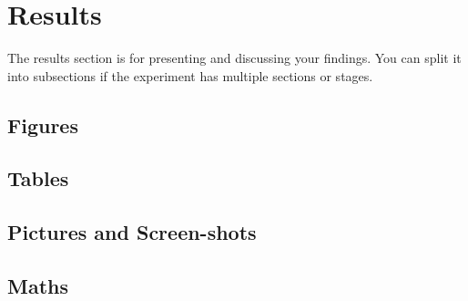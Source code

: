 \section{Results}
The results section is for presenting and discussing your findings.  You can split it into subsections if the experiment has multiple sections or stages.



\subsection{Figures}

\subsection{Tables}

\subsection{Pictures and Screen-shots}

\subsection{Maths}


